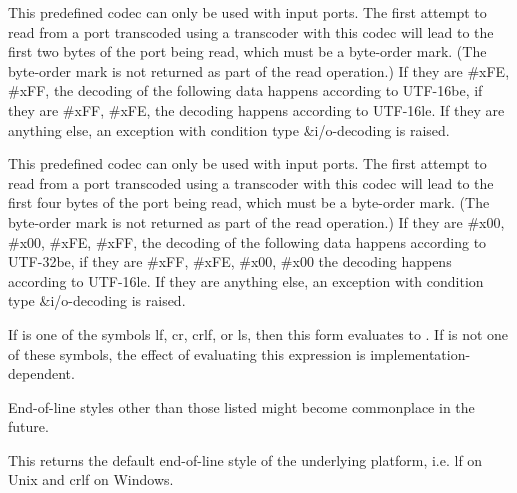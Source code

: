 \begin{entry}{%
}
   
This predefined codec can only be used with input ports. The first
attempt to read from a port transcoded using a transcoder with this
codec will lead to the first two bytes of the port being read, which
must be a byte-order mark. (The byte-order mark is not returned as
part of the read operation.) If they are \#xFE, \#xFF, the decoding of
the following data happens according to UTF-16be, if they are \#xFF,
\#xFE, the decoding happens according to UTF-16le.  If they are
anything else, an exception with condition type {\cf\&i/o-decoding} is
raised.
\end{entry}

\begin{entry}{%
}
   
This predefined codec can only be used with input ports.  The first
attempt to read from a port transcoded using a transcoder with this
codec will lead to the first four bytes of the port being read, which
must be a byte-order mark. (The byte-order mark is not returned as
part of the read operation.) If they are \#x00, \#x00, \#xFE, \#xFF,
the decoding of the following data happens according to UTF-32be, if
they are \#xFF, \#xFE, \#x00, \#x00 the decoding happens according to
UTF-16le.  If they are anything else, an exception with condition type
{\cf\&i/o-decoding} is raised.
\end{entry}

\begin{entry}{%
}

If  is one of the symbols {\cf lf}, {\cf cr}, {\cf crlf}, or
{\cf ls}, then this form evaluates to .  If  is
not one of these symbols, the effect of evaluating this expression is
implementation-dependent.

\begin{rationale}
  End-of-line styles other than those listed might become commonplace
  in the future.
\end{rationale}
\end{entry}

\begin{entry}{%
}

This returns the default end-of-line style of the underlying platform, i.e.
{\cf lf} on Unix and {\cf crlf} on Windows.
\end{entry}

